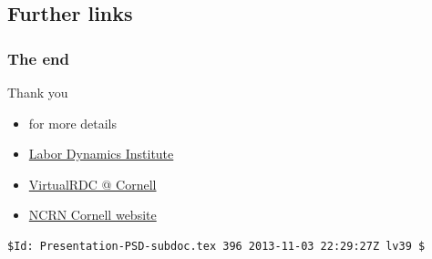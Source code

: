 \subsection{Further links}
\begin{slide}
\frametitle{The end}
\begin{block}{Thank you}
\begin{itemize}
\item \cite{AbowdVilhuberBlock2012} for more details
\item \href{http://www.ilr.cornell.edu/LDI/}{Labor Dynamics Institute}
\item \href{http://www.vrdc.cornell.edu}{VirtualRDC @ Cornell}
\item \href{http://www.ncrn.cornell.edu/}{NCRN Cornell website}
\end{itemize}
\end{block}
\end{slide}

\begin{frame}[fragile]
\begin{verbatim}
$Id: Presentation-PSD-subdoc.tex 396 2013-11-03 22:29:27Z lv39 $
\end{verbatim}
\end{frame}

